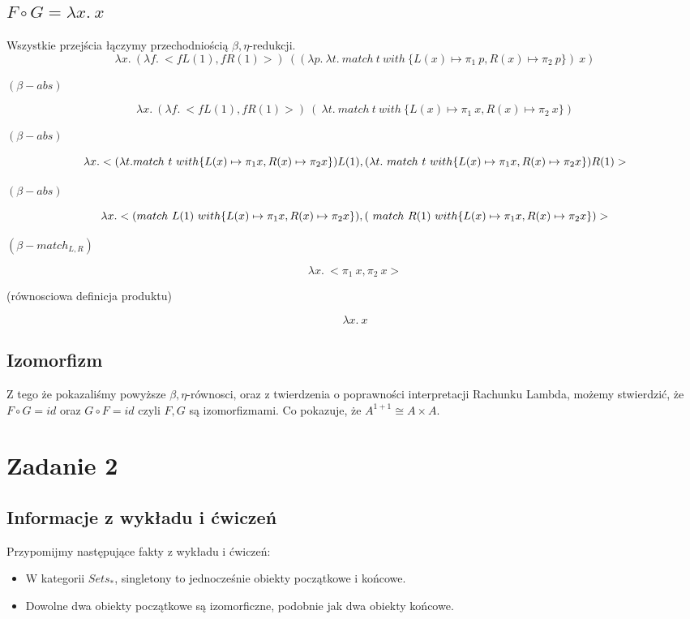 \documentclass[11pt]{article}
\begin{document}
\subsection{$F \circ G = \lambda x. \ x$}
Wszystkie przejścia łączymy przechodniością $\beta, \eta$-redukcji.
\[
    \lambda x. \ ( \lambda f. \ <f L(1), f R(1)>  ) \ (( \lambda p. \ \lambda t. \ match \ t \ with \ \{L(x) \mapsto \pi_1 \ p, R(x) \mapsto \pi_2 \ p\} ) \ x) 
\]
\centerline{$(\beta - abs)$}
\[
    \lambda x. \ ( \lambda f. \ <f L(1), f R(1)>  ) \ ( \ \lambda t. \ match \ t \ with \ \{L(x) \mapsto \pi_1 \ x, R(x) \mapsto \pi_2 \ x\} )  
\]
\centerline{$(\beta - abs)$}
\[
    \lambda x. <( \lambda t. match \ t \ with \{L(x) \mapsto \pi_1 x, \\ R(x) \mapsto \pi_2 x\} )  L(1), ( \lambda t. \ match \ t \ with  \{L(x) \mapsto \pi_1  x, R(x) \mapsto \pi_2 x\} )  R(1)> 
\]
\centerline{$(\beta - abs)$}
\[
    \lambda x. <( match \ L(1) \ with \{L(x) \mapsto \pi_1 x, \\ R(x) \mapsto \pi_2 x\} )  , (  \ match \ R(1) \ with  \{L(x) \mapsto \pi_1  x, R(x) \mapsto \pi_2 x\} )  > 
\]
\centerline{$(\beta - match_{L,R})$}
\[
    \lambda x. \ < \pi_1 \ x, \pi_2 \ x >
\]
\centerline{(równosciowa definicja produktu)}
\[
  \lambda x. \ x  
\]

\subsection*{Izomorfizm}
Z tego że pokazaliśmy powyższe $\beta, \eta$-równosci, oraz z twierdzenia o poprawności interpretacji Rachunku Lambda, możemy stwierdzić,
 że $F \circ G = id$ oraz $G \circ F = id$ czyli $F, G$ są izomorfizmami. Co pokazuje, że $A^{1 + 1} \cong A \times A$.


\pagebreak
\section{Zadanie 2}

\subsection{Informacje z wykładu i ćwiczeń}
Przypomijmy następujące fakty z wykładu i ćwiczeń:
\begin{itemize}
    \item W kategorii $Sets_*$, singletony to jednocześnie obiekty początkowe i końcowe. 
    \item Dowolne dwa obiekty początkowe są izomorficzne, podobnie jak dwa obiekty końcowe.
  \end{itemize}
\end{document}
